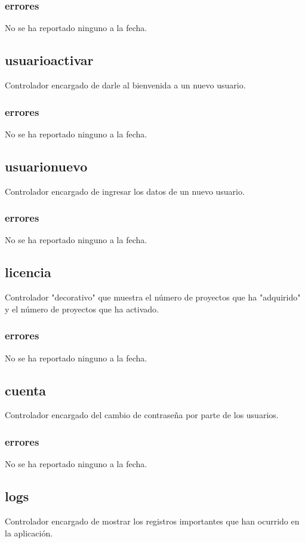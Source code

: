\documentclass[10pt,a4paper]{book}
\begin{document}
	\subsubsection{errores}
	No se ha reportado ninguno a la fecha.

	\subsection{usuarioactivar}
	Controlador encargado de darle al bienvenida a un nuevo usuario.
	\subsubsection{errores}
	No se ha reportado ninguno a la fecha.

	\subsection{usuarionuevo}
	Controlador encargado de ingresar los datos de un nuevo usuario.
	\subsubsection{errores}
	No se ha reportado ninguno a la fecha.


	\subsection{licencia}
	Controlador "decorativo" que muestra el número de proyectos que ha "adquirido" y el número de proyectos que ha activado.
	\subsubsection{errores}
	No se ha reportado ninguno a la fecha.

	\subsection{cuenta}
	Controlador encargado del cambio de contraseña por parte de los usuarios.
	\subsubsection{errores}
	No se ha reportado ninguno a la fecha.

	\subsection{logs}
	Controlador encargado de mostrar los registros importantes que han ocurrido en la aplicación.
\end{document}
